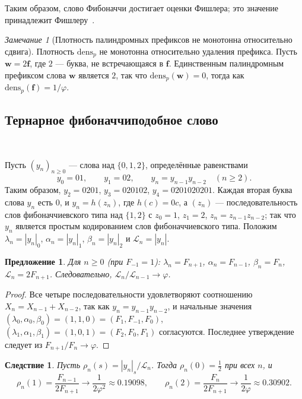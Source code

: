 \documentclass[a4paper,14pt]{extreport}
\theoremstyle{plain}
\newtheorem{proposition}[theorem]{Предложение}
\newtheorem{corollary}[theorem]{Следствие}
\theoremstyle{definition}
\theoremstyle{remark}
\newtheorem{remark}{Замечание}
\begin{document}
Таким образом, слово Фибоначчи достигает оценки Фишлера; это значение принадлежит Фишлеру~\cite{Fischler}.

\begin{remark}[Плотность палиндромных префиксов не монотонна относительно сдвига]
	Плотность $\mathrm{dens}_p$ не монотонна относительно удаления префикса. Пусть $\mathbf w=2\mathbf f$, где $2$ --- буква,
	не встречающаяся в $\mathbf f$. Единственным палиндромным префиксом слова $\mathbf w$ является $2$, так что $\mathrm{dens}_p(\mathbf w)=0$,
	тогда как $\mathrm{dens}_p(\mathbf f)=1/\varphi$. 
\end{remark}
\subsection{Тернарное фибоначчиподобное слово}~\label{sec3.6.3}

Пусть $(y_n)_{n\ge0}$ --- слова над $\{0,1,2\}$, определённые равенствами
\begin{equation}
	y_0=01,\qquad y_1=02,\qquad y_n=y_{n-1}y_{n-2}\quad(n\ge2).
\end{equation}
Таким образом, $y_2=0201$, $y_3=020102$, $y_4=0201020201$. Каждая вторая буква слова $y_n$ есть $0$, и $y_n=h(z_n)$, где
$h(c)=0c$, а $(z_n)$ --- последовательность слов фибоначчиевского типа над $\{1,2\}$ с $z_0=1$, $z_1=2$, $z_n=z_{n-1}z_{n-2}$;
так что $y_n$ является простым кодированием слов фибоначчиевского типа. Положим $\lambda_n=|y_n|_0$, $\alpha_n=|y_n|_1$, $\beta_n=|y_n|_2$ и
$\mathcal L_n=|y_n|$.

\begin{proposition}\label{lemmanovelwordn1}
	Для $n\ge0$ (при $F_{-1}=1$): $\lambda_n=F_{n+1}$, $\alpha_n=F_{n-1}$, $\beta_n=F_n$, $\mathcal L_n=2F_{n+1}$.
	Следовательно, $\mathcal L_n/\mathcal L_{n-1}\to\varphi$.
\end{proposition}
\begin{proof}
	Все четыре последовательности удовлетворяют соотношению $X_n=X_{n-1}+X_{n-2}$, так как $y_n=y_{n-1}y_{n-2}$, и начальные значения
	$(\lambda_0,\alpha_0,\beta_0)=(1,1,0)=(F_1,F_{-1},F_0)$, $(\lambda_1,\alpha_1,\beta_1)=(1,0,1)=(F_2,F_0,F_1)$ согласуются.
	Последнее утверждение следует из $F_{n+1}/F_n\to\varphi$.
\end{proof}

\begin{corollary}\label{eq1densityn1}
	Пусть $\rho_n(s)=|y_n|_s/\mathcal L_n$. Тогда $\rho_n(0)=\tfrac12$ при всех $n$, и
	\begin{equation}
		\rho_n(1)=\frac{F_{n-1}}{2F_{n+1}}\longrightarrow\frac1{2\varphi^{2}}\approx0.19098,\qquad
		\rho_n(2)=\frac{F_n}{2F_{n+1}}\longrightarrow\frac1{2\varphi}\approx0.30902 .
	\end{equation}
\end{corollary}
\end{document}
